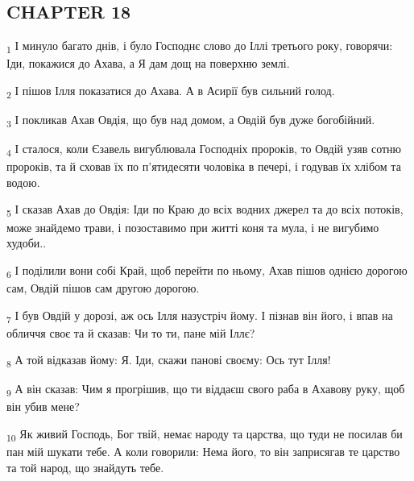 \subsection{CHAPTER 18}
\begin{tcolorbox}
\textsubscript{1} І минуло багато днів, і було Господнє слово до Іллі третього року, говорячи: Іди, покажися до Ахава, а Я дам дощ на поверхню землі.
\end{tcolorbox}
\begin{tcolorbox}
\textsubscript{2} І пішов Ілля показатися до Ахава. А в Асирії був сильний голод.
\end{tcolorbox}
\begin{tcolorbox}
\textsubscript{3} І покликав Ахав Овдія, що був над домом, а Овдій був дуже богобійний.
\end{tcolorbox}
\begin{tcolorbox}
\textsubscript{4} І сталося, коли Єзавель вигублювала Господніх пророків, то Овдій узяв сотню пророків, та й сховав їх по п'ятидесяти чоловіка в печері, і годував їх хлібом та водою.
\end{tcolorbox}
\begin{tcolorbox}
\textsubscript{5} І сказав Ахав до Овдія: Іди по Краю до всіх водних джерел та до всіх потоків, може знайдемо трави, і позоставимо при житті коня та мула, і не вигубимо худоби..
\end{tcolorbox}
\begin{tcolorbox}
\textsubscript{6} І поділили вони собі Край, щоб перейти по ньому, Ахав пішов однією дорогою сам, Овдій пішов сам другою дорогою.
\end{tcolorbox}
\begin{tcolorbox}
\textsubscript{7} І був Овдій у дорозі, аж ось Ілля назустріч йому. І пізнав він його, і впав на обличчя своє та й сказав: Чи то ти, пане мій Іллє?
\end{tcolorbox}
\begin{tcolorbox}
\textsubscript{8} А той відказав йому: Я. Іди, скажи панові своєму: Ось тут Ілля!
\end{tcolorbox}
\begin{tcolorbox}
\textsubscript{9} А він сказав: Чим я прогрішив, що ти віддаєш свого раба в Ахавову руку, щоб він убив мене?
\end{tcolorbox}
\begin{tcolorbox}
\textsubscript{10} Як живий Господь, Бог твій, немає народу та царства, що туди не посилав би пан мій шукати тебе. А коли говорили: Нема його, то він заприсягав те царство та той народ, що знайдуть тебе.
\end{tcolorbox}
